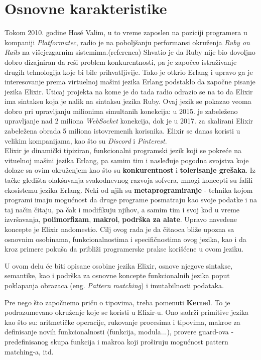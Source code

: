 \documentclass[12pt,oneside]{memoir}
\begin{document}
\section{Osnovne karakteristike}

Tokom 2010. godine Hosé Valim, u to vreme zaposlen na poziciji programera u kompaniji \textit{Platformatec}, radio je na poboljšanju performansi okruženja
\textit{Ruby on Rails} na višejezgarnim sistemima.(referenca) Shvatio je da Ruby nije bio dovoljno dobro dizajniran da reši problem konkurentnosti, pa je započeo istraživanje drugih tehnologija koje bi bile prihvatljivije. Tako je otkrio Erlang i upravo ga je interesovanje prema virtuelnoj mašini jezika Erlang podstaklo da započne pisanje jezika Elixir. Uticaj projekta na kome je do tada radio odrazio se na to da Elixir ima sintaksu koja je nalik na sintaksu jezika Ruby. Ovaj jezik se pokazao veoma dobro pri upravljanju
milionima simultanih konekcija: u 2015. je zabeleženo upravljanje nad 2 miliona \textit{WebSocket} konekcija, dok je u 2017. za skalirani Elixir zabeležena obrada 5 miliona istovremenih korisnika. Elixir se danas koristi u velikim kompanijama, kao što su \textit{Discord}  i \textit{Pinterest}.\\

Elixir je dinamički tipiziran, funkcionalni programski jezik koji se pokreće na vituelnoj mašini jezika Erlang, pa samim tim i nasleđuje pogodna svojstva koje dolaze sa ovim okruženjem kao što su \textbf{konkurentnost} i \textbf{tolerisanje grešaka}. Iz tačke gledišta olakšavanja svakodnevnog razvoja sofvera, mnogi koncepti su falili ekosistemu jezika Erlang. Neki od njih su \textbf{metaprogramiranje} - tehnika kojom programi imaju mogućnost da druge programe posmatraju kao svoje podatke i na taj način čitaju, pa
čak i modifikuju njihov, a samim tim i svoj kod u vreme izvršavanja, \textbf{polimorfizam}, \textbf{makroi}, \textbf{podrška za alate}. Upravo navedene koncepte je  Elixir nadomestio. Cilj ovog rada je da čitaoca bliže upozna sa osnovnim osobinama, funkcionalnostima i specifičnostima ovog jezika,  kao i da kroz primere pokuša da približi programerske prakse korišćene u ovom jeziku.

U ovom delu će biti opisane osobine jezika Elixir, osnove njegove sintakse, semantike, kao i podrška za osnovne koncepte funkcionalnih jezika poput poklapanja obrazaca (eng. \textit{Pattern matching}) i imutabilnosti podataka.

Pre nego što započnemo priču o tipovima, treba pomenuti \textbf{Kernel}. To je podrazumevano okruženje koje se koristi u Elixir-u. Ono sadrži primitive jezika kao što su: aritmetičke operacije, rukovanje procesima i tipovima, makroe za definisanje novih funkcionalnosti (funkcija, modula...), provere guard-ova - predefinisanog skupa funkcija i makroa koji proširuju
mogućnost pattern matching-a, itd.
\end{document}
